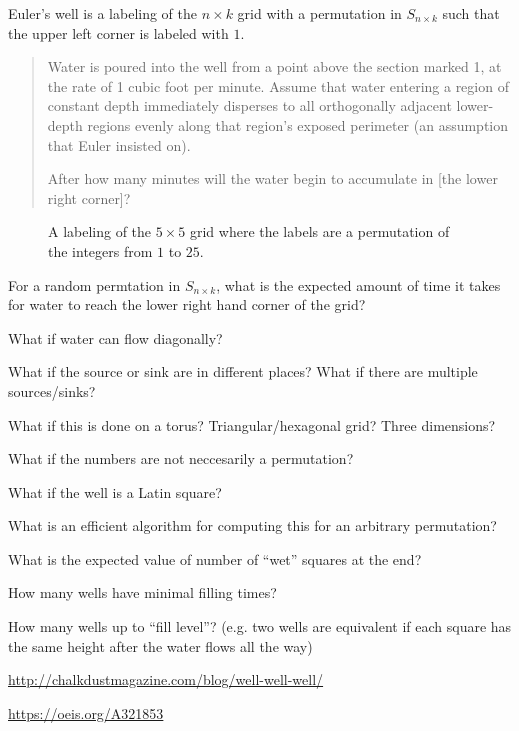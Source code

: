 \documentclass{article}
\begin{document}
Euler's well is a labeling of the $n \times k$ grid with a permutation in
$S_{n \times k}$ such that the upper left corner is labeled with $1$.
\begin{quote}
  Water is poured into the well from a point above the section marked 1, at the rate of 1 cubic foot per minute. Assume that water entering a region of constant depth immediately disperses to all orthogonally adjacent lower-depth regions evenly along that region’s exposed perimeter (an assumption that Euler insisted on).

After how many minutes will the water begin to accumulate in
[the lower right corner]?
\end{quote}

\begin{figure}[ht!]
  \centering
  \caption{
    A labeling of the $5 \times 5$ grid where the labels are a permutation of
    the integers from $1$ to $25$.
  }
\end{figure}
\begin{question}
  For a random permtation in $S_{n \times k}$, what is the expected amount of
  time it takes for water to reach the lower right hand corner of the grid?
\end{question}

\begin{related}
  \item What if water can flow diagonally?
  \item What if the source or sink are in different places? What if there are
  multiple sources/sinks?
  \item What if this is done on a torus? Triangular/hexagonal grid? Three
  dimensions?
  \item What if the numbers are not neccesarily a permutation?
  \item What if the well is a Latin square?
  \item What is an efficient algorithm for computing this for an arbitrary
  permutation?
  \item What is the expected value of number of ``wet'' squares at the end?
  \item How many wells have minimal filling times?
  \item How many wells up to ``fill level''? (e.g. two wells are equivalent if
  each square has the same height after the water flows all the way)
\end{related}

\begin{references}
  \item \url{http://chalkdustmagazine.com/blog/well-well-well/}
  \item \url{https://oeis.org/A321853}
\end{references}
\end{document}
